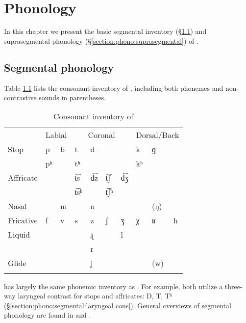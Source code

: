 \chapter{Phonology}\label{section phono}
In this chapter we present the basic segmental inventory  (\S\ref{section:phono:segmental}) and suprasegmental phonology (\S\ref{section:phono:suprasegmental})  of  {\iaIA}.\largerpage




\section{Segmental phonology}\label{section:phono:segmental}
\begin{sloppypar}
Table \ref{table: consontants of iranian} lists the consonant inventory of {\iaIA}, including both phonemes and non-contrastive sounds in parentheses.
\end{sloppypar}

	\begin{table}
	
	\caption{Consonant inventory of {\iaIA}}\label{table: consontants of iranian}
	\centering
	\begin{tabular}{l  ll  l lll ll  l}
		\lsptoprule
		&\multicolumn{2}{c}{Labial}	&\multicolumn{4}{c}{Coronal} &\multicolumn{3}{c}{Dorsal/Back}\\\cmidrule(lr){2-3}\cmidrule(lr){4-7}\cmidrule(lr){8-10}
		Stop
		&
		{p} &  b& {t} &  d  &&  &   {k} &  ɡ & 
		\\
		& pʰ & & tʰ & & & & kʰ & & 
		\\
		
		Affricate &   & & {t͡s} &   d͡z&  {t͡ʃ}     &d͡ʒ &&  & \\
		&&  & t͡sʰ & & t͡ʃʰ  & & && \\
		Nasal & &{m}&  & {n} & &&&  (ŋ) &	\\
		Fricative & {f} & v & {s}& z&  {ʃ} & ʒ & {χ}  & ʁ& {h}\\
		Liquid  && & & {ɻ} &   & {l} & & & \\
		&& & &   {r} &  & & & & \\
		Glide & &&&   {j} &  &&&    ({w})  &  \\ \lspbottomrule
	\end{tabular}
	
	
\end{table}



{\iaIA} has largely the same phonemic inventory as   {\seaEA}. For example, both utilize a three-way laryngeal contrast for stops and affricates: D, T, Tʰ  (\S\ref{section:phono:segmental:laryngeal cons}).  General overviews of {\seaSEA} segmental phonology are found in \citet[\S1]{Vaux-1998-ArmenianPhono} and \citet[\S1--3]{Johnson-1954-EastArmGrammar}.



